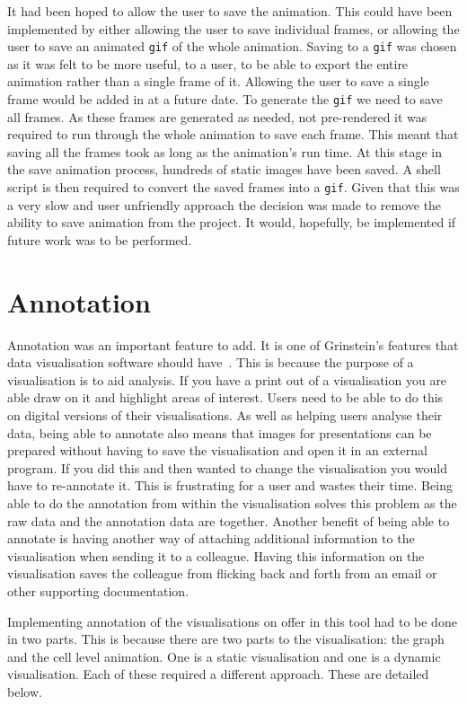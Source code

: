 It had been hoped to allow the user to save the animation.  This could have been implemented by either allowing the user to save individual frames, or allowing the user to save an animated \texttt{gif} of the whole animation.  Saving to a \texttt{gif} was chosen as it was felt to be more useful, to a user, to be able to export the entire animation rather than a single frame of it.  Allowing the user to save a single frame would be added in at a future date.  To generate the \texttt{gif} we need to save all frames.  As these frames are generated as needed, not pre-rendered it was required to run through the whole animation to save each frame.  This meant that saving all the frames took as long as the animation's run time.  At this stage in the save animation process, hundreds of static images have been saved.  A shell script is then required to convert the saved frames into a \texttt{gif}.  Given that this was a very slow and user unfriendly approach the decision was made to remove the ability to save animation from the project.  It would, hopefully, be implemented if future work was to be performed.

\section{Annotation}

Annotation was an important feature to add.  It is one of Grinstein's features that data visualisation software should have~\cite{gg_vizbi}.  This is because the purpose of a visualisation is to aid analysis.  If you have a print out of a visualisation you are able draw on it and highlight areas of interest.  Users need to be able to do this on digital versions of their visualisations.  As well as helping users analyse their data, being able to annotate also means that images for presentations can be prepared without having to save the visualisation and open it in an external program.  If you did this and then wanted to change the visualisation you would have to re-annotate it.  This is frustrating for a user and wastes their time.  Being able to do the annotation from within the visualisation solves this problem as the raw data and the annotation data are together.  Another benefit of being able to annotate is having another way of attaching additional information to the visualisation when sending it to a colleague. Having this information on the visualisation saves the colleague from flicking back and forth from an email or other supporting documentation.

Implementing annotation of the visualisations on offer in this tool had to be done in two parts.  This is because there are two parts to the visualisation:  the graph and the cell level animation.  One is a static visualisation and one is a dynamic visualisation.  Each of these required a different approach.  These are detailed below.

